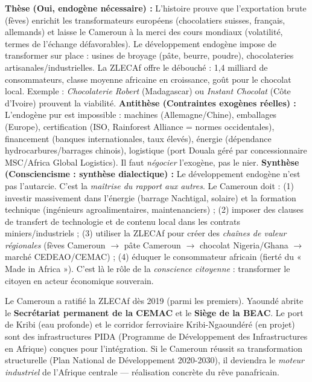 \documentclass[11pt]{article}
\begin{document}
\begin{corrige}
\textbf{Thèse (Oui, endogène nécessaire) :} L'histoire prouve que l'exportation brute (fèves) enrichit les transformateurs européens (chocolatiers suisses, français, allemands) et laisse le Cameroun à la merci des cours mondiaux (volatilité, termes de l'échange défavorables). Le développement endogène impose de transformer sur place : usines de broyage (pâte, beurre, poudre), chocolateries artisanales/industrielles. La ZLECAf offre le débouché : 1,4 milliard de consommateurs, classe moyenne africaine en croissance, goût pour le chocolat local. Exemple : \emph{Chocolaterie Robert} (Madagascar) ou \emph{Instant Chocolat} (Côte d'Ivoire) prouvent la viabilité.
\textbf{Antithèse (Contraintes exogènes réelles) :} L'endogène pur est impossible : machines (Allemagne/Chine), emballages (Europe), certification (ISO, Rainforest Alliance = normes occidentales), financement (banques internationales, taux élevés), énergie (dépendance hydrocarbures/barrages chinois), logistique (port Douala géré par concessionnaire MSC/Africa Global Logistics). Il faut \emph{négocier} l'exogène, pas le nier.
\textbf{Synthèse (Consciencisme : synthèse dialectique) :} Le développement endogène n'est pas l'autarcie. C'est la \emph{maîtrise du rapport aux autres}. Le Cameroun doit : (1) investir massivement dans l'énergie (barrage Nachtigal, solaire) et la formation technique (ingénieurs agroalimentaires, maintenanciers) ; (2) imposer des clauses de transfert de technologie et de contenu local dans les contrats miniers/industriels ; (3) utiliser la ZLECAf pour créer des \emph{chaînes de valeur régionales} (fèves Cameroun $\to$ pâte Cameroun $\to$ chocolat Nigeria/Ghana $\to$ marché CEDEAO/CEMAC) ; (4) éduquer le consommateur africain (fierté du « Made in Africa »). C'est là le rôle de la \emph{conscience citoyenne} : transformer le citoyen en acteur économique souverain.
\end{corrige}

\begin{savaistu}
Le Cameroun a ratifié la ZLECAf dès 2019 (parmi les premiers). Yaoundé abrite le \textbf{Secrétariat permanent de la CEMAC} et le \textbf{Siège de la BEAC}. Le port de Kribi (eau profonde) et le corridor ferroviaire Kribi-Ngaoundéré (en projet) sont des infrastructures PIDA (Programme de Développement des Infrastructures en Afrique) conçues pour l'intégration. Si le Cameroun réussit sa transformation structurelle (Plan National de Développement 2020-2030), il deviendra le \emph{moteur industriel} de l'Afrique centrale — réalisation concrète du rêve panafricain.
\end{savaistu}
\end{document}
